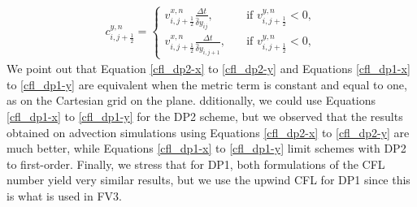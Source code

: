 \begin{align}
	\label{cfl_dp1-y}
	{c}_{i,j+\frac{1}{2}}^{y,n} =
	\begin{cases}
		{{v}}_{i,j+\frac{1}{2}}^{x,n}\frac{\Delta t}{\hat{\delta} y_{ij}},
		\quad &\text{if }{{{v}}_{i,j+\frac{1}{2}}^{y,n} < 0},\\
		{{v}}_{i,j+\frac{1}{2}}^{x,n}\frac{\Delta t}{\hat{\delta} y_{i,j+1}},
		\quad &\text{if }{{{v}}_{i,j+\frac{1}{2}}^{y,n} < 0},
	\end{cases}
\end{align}
We point out that Equation \eqref{cfl_dp2-x} to \eqref{cfl_dp2-y} and Equations \eqref{cfl_dp1-x} to \eqref{cfl_dp1-y} 
are equivalent when the metric term is constant and equal to one, as on the Cartesian grid on the plane.
dditionally, we could use Equations \eqref{cfl_dp1-x} to \eqref{cfl_dp1-y} for the DP2 scheme, 
but we observed that the results obtained on advection simulations using Equations \eqref{cfl_dp2-x} to \eqref{cfl_dp2-y} are much better, 
while Equations \eqref{cfl_dp1-x} to \eqref{cfl_dp1-y} limit schemes with DP2 to first-order. 
Finally, we stress that for DP1, both formulations of the CFL number yield very similar results, but we use the upwind CFL for DP1 since this is what is used in FV3.

